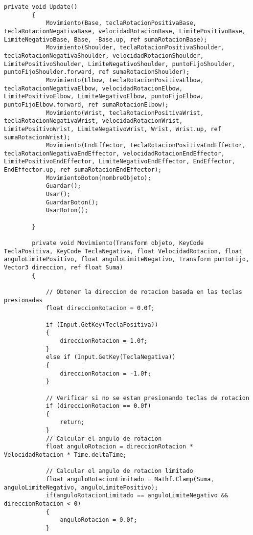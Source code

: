 \begin{lstlisting}[frame=single]
        private void Update()
        {
            Movimiento(Base, teclaRotacionPositivaBase, teclaRotacionNegativaBase, velocidadRotacionBase, LimitePositivoBase, LimiteNegativoBase, Base, -Base.up, ref sumaRotacionBase);
            Movimiento(Shoulder, teclaRotacionPositivaShoulder, teclaRotacionNegativaShoulder, velocidadRotacionShoulder, LimitePositivoShoulder, LimiteNegativoShoulder, puntoFijoShoulder, puntoFijoShoulder.forward, ref sumaRotacionShoulder);
            Movimiento(Elbow, teclaRotacionPositivaElbow, teclaRotacionNegativaElbow, velocidadRotacionElbow, LimitePositivoElbow, LimiteNegativoElbow, puntoFijoElbow, puntoFijoElbow.forward, ref sumaRotacionElbow);
            Movimiento(Wrist, teclaRotacionPositivaWrist, teclaRotacionNegativaWrist, velocidadRotacionWrist, LimitePositivoWrist, LimiteNegativoWrist, Wrist, Wrist.up, ref sumaRotacionWrist);
            Movimiento(EndEffector, teclaRotacionPositivaEndEffector, teclaRotacionNegativaEndEffector, velocidadRotacionEndEffector, LimitePositivoEndEffector, LimiteNegativoEndEffector, EndEffector, EndEffector.up, ref sumaRotacionEndEffector);
            MovimientoBoton(nombreObjeto);
            Guardar();
            Usar();
            GuardarBoton();
            UsarBoton();
            
        }
    
        private void Movimiento(Transform objeto, KeyCode TeclaPositiva, KeyCode TeclaNegativa, float VelocidadRotacion, float anguloLimitePositivo, float anguloLimiteNegativo, Transform puntoFijo, Vector3 direccion, ref float Suma)
        {
            
            // Obtener la direccion de rotacion basada en las teclas presionadas
            float direccionRotacion = 0.0f;

            if (Input.GetKey(TeclaPositiva))
            {
                direccionRotacion = 1.0f;
            }
            else if (Input.GetKey(TeclaNegativa))
            {
                direccionRotacion = -1.0f;
            }

            // Verificar si no se estan presionando teclas de rotacion
            if (direccionRotacion == 0.0f)
            {
                return;
            }
            // Calcular el angulo de rotacion
            float anguloRotacion = direccionRotacion * VelocidadRotacion * Time.deltaTime;
            
            // Calcular el angulo de rotacion limitado
            float anguloRotacionLimitado = Mathf.Clamp(Suma, anguloLimiteNegativo, anguloLimitePositivo);
            if(anguloRotacionLimitado == anguloLimiteNegativo && direccionRotacion < 0)
            {
                anguloRotacion = 0.0f;
            }


\end{lstlisting}
